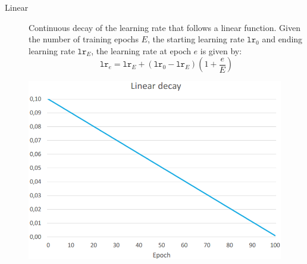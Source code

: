 \begin{minipage}{0.6\linewidth}
    \begin{description}
        \item[Linear]
            Continuous decay of the learning rate that follows a linear function.
            Given the number of training epochs $E$, the starting learning rate $\texttt{lr}_0$ and ending learning rate $\texttt{lr}_E$, the learning rate at epoch $e$ is given by:
            \[ \texttt{lr}_e = \texttt{lr}_E + (\texttt{lr}_0 - \texttt{lr}_E) \left( 1 + \frac{e}{E} \right) \]
    \end{description}
\end{minipage}
\begin{minipage}{0.35\linewidth}
    \begin{figure}[H]
        \centering
        \includegraphics[width=0.9\linewidth]{./img/lr_schedule_linear.png}
    \end{figure}
\end{minipage}

